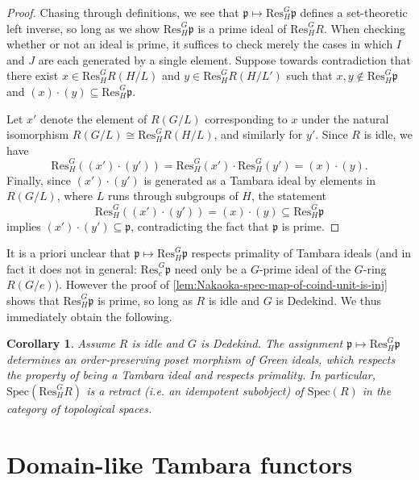 \documentclass[11pt,dvipsnames]{amsart}
\newcommand{\p}{\mathfrak{p}}
\newtheorem{corollary}[theorem]{Corollary}
\theoremstyle{BoldRemark}
\newcommand{\Res}{\mathrm{Res}}
\newcommand{\Spec}{\mathrm{Spec}}
\renewcommand{\subset}{\subseteq}
\begin{document}
\begin{proof}
    Chasing through definitions, we see that $\p \mapsto \Res_H^G \p$ defines a set-theoretic left inverse, so long as we show $\Res_H^G \p$ is a prime ideal of $\Res_H^G R$. When checking whether or not an ideal is prime, it suffices to check merely the cases in which $I$ and $J$ are each generated by a single element. Suppose towards contradiction that there exist $x \in \Res_H^G R(H/L)$ and $y \in \Res_H^G R(H/L')$ such that $x, y \notin \Res_H^G \p$ and $(x) \cdot (y) \subset \Res_H^G \p$. 
    
    Let $x'$ denote the element of $R(G/L)$ corresponding to $x$ under the natural isomorphism $R(G/L) \cong \Res_H^G R(H/L)$, and similarly for $y'$. Since $R$ is idle, we have 
    \[ 
        \Res_H^G \left( (x') \cdot (y') \right) = \Res_H^G (x') \cdot \Res_H^G (y') = (x) \cdot (y) . 
    \]
    Finally, since $(x') \cdot (y')$ is generated as a Tambara ideal by elements in $R(G/L)$, where $L$ runs through subgroups of $H$, the statement 
    \[ 
        \Res_H^G \left( (x') \cdot (y') \right) = (x) \cdot (y) \subset \Res_H^G \p 
    \] 
    implies $(x') \cdot (y') \subset \p$, contradicting the fact that $\p$ is prime.
\end{proof}

It is a priori unclear that $\p \mapsto \Res_H^G \p$ respects primality of Tambara ideals (and in fact it does not in general: $\Res_e^G \p$ need only be a $G$-prime ideal of the $G$-ring $R(G/e)$). However the proof of \cref{lem:Nakaoka-spec-map-of-coind-unit-is-inj} shows that $\Res_H^G \p$ is prime, so long as $R$ is idle and $G$ is Dedekind. We thus immediately obtain the following.

\begin{corollary}\label{cor:idle+Dedekind-implies-stratification-is-injective}
    Assume $R$ is idle and $G$ is Dedekind. The assignment $\p \mapsto \Res_H^G \p$ determines an order-preserving poset morphism of Green ideals, which respects the property of being a Tambara ideal and respects primality. In particular, $\Spec(\Res_H^G R)$ is a retract (i.e. an idempotent subobject) of $\Spec(R)$ in the category of topological spaces.
\end{corollary}


\section{Domain-like Tambara functors}
\end{document}
